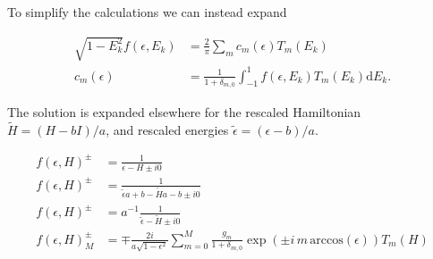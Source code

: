\documentclass[10pt, onecolumn, aps, prb, superscriptaddress, floatfix, showpacs, notitlepage]{revtex4-1}
\begin{document}
To simplify the calculations we can instead expand

\begin{align}
\sqrt{1-E_k^2}f(\epsilon, E_k) &= \frac{2}{\pi}\sum_m c_m(\epsilon)T_m(E_k)\\
c_m(\epsilon) &=\frac{1}{1+\delta_{m,0}}
\int_{-1}^1 {f(\epsilon, E_k) T_m(E_k)}\mathrm{d}E_k.
\end{align}


The solution is expanded elsewhere\cite{Garcia2014} for the rescaled
Hamiltonian $\tilde{H}=(H-bI)/a$, and rescaled energies
$\tilde{\epsilon}=(\epsilon-b)/a$.

\begin{align}
f(\epsilon, H)^\pm &= \frac{1}{\epsilon-H \pm i0}\\
f(\epsilon, H)^\pm &= \frac{1}{\tilde{\epsilon}a+b-\tilde{H}a-b \pm i0}\\
f(\epsilon, H)^\pm &= a^{-1}\frac{1}{\tilde{\epsilon}-\tilde{H} \pm i0}\\
f(\epsilon, H)^\pm_M &= \mp \frac{2i}{a\sqrt{1-\epsilon^2}}
\sum_{m=0}^{M}\frac{g_m}{1+\delta_{m,0}}
\exp(\pm i\,m\,\mathrm{arccos}(\epsilon)) T_m(H)
\end{align}


% 


\end{document}
